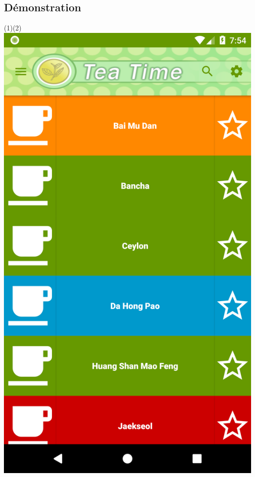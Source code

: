 \documentclass[a4paper,12pt]{article}
\begin{document}
\begin{spacing}{1}
	\section*{Démonstration}
	(1)\space\space\space\space\space\space\space\space\space\space\space\space\space\space\space\space\space\space\space\space\space\space\space\space(2)\\
	\includegraphics*[scale=0.1]{Screenshot/01.png}       

\end{spacing}
\end{document}
